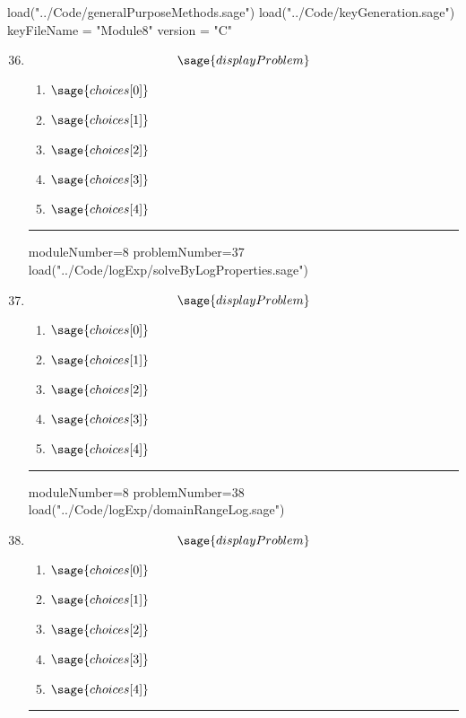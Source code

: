 \documentclass[14pt]{article}
\newcommand{\litem}[1]{\item#1\hspace*{-1cm}\rule{\textwidth}{0.4pt}}
\begin{document}
\pagestyle{fancy}

\begin{sagesilent}
load("../Code/generalPurposeMethods.sage")
load("../Code/keyGeneration.sage")
keyFileName = "Module8"
version = "C"
\end{sagesilent}

\begin{enumerate}
\setcounter{enumi}{35}


\begin{sagesilent}
moduleNumber=8
problemNumber = 36
load("../Code/logExp/solveExpDifferentBases.sage")
\end{sagesilent}

\litem{

\[ \sage{displayProblem} \]

\begin{enumerate}[label=\Alph*.]
\item \( \sage{choices[0]} \)
\item \( \sage{choices[1]} \)
\item \( \sage{choices[2]} \)
\item \( \sage{choices[3]} \)
\item \( \sage{choices[4]} \)
\end{enumerate} }


\begin{sagesilent}
moduleNumber=8
problemNumber=37
load("../Code/logExp/solveByLogProperties.sage")
\end{sagesilent}

\litem{ 
	\[ \sage{displayProblem} \]
	\begin{enumerate}[label=\Alph*.]
  \item \( \sage{choices[0]} \)
  \item \( \sage{choices[1]} \)
  \item \( \sage{choices[2]} \)
  \item \( \sage{choices[3]} \)
  \item \( \sage{choices[4]} \)
	\end{enumerate}
}

\begin{sagesilent}
moduleNumber=8
problemNumber=38
load("../Code/logExp/domainRangeLog.sage")
\end{sagesilent}

\litem{ 
\[ \sage{displayProblem} \]
	\begin{enumerate}[label=\Alph*.]
		\item \( \sage{choices[0]} \)
		\item \( \sage{choices[1]} \)
		\item \( \sage{choices[2]} \)
		\item \( \sage{choices[3]} \)
		\item \( \sage{choices[4]} \)
	\end{enumerate}
}


\end{enumerate}
\end{document}
